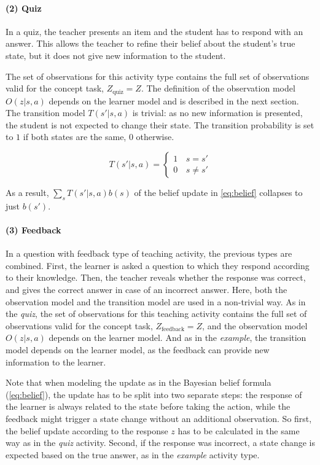 \paragraph{(2) Quiz} In a quiz, the teacher presents an item and the student has to respond with an answer.
This allows the teacher to refine their belief about the student's true state, but it does not give new information to the student. 

The set of observations for this activity type contains the full set of observations valid for the concept task, $Z_{\text{quiz}} = Z$.
The definition of the observation model $O(z|s,a)$ depends on the learner model and is described in the next section. 
The transition model $T(s'|s,a)$ is trivial: as no new information is presented, the student is not expected to change their state. The transition probability is set to $1$ if both states are the same, $0$ otherwise.

\begin{equation}
    T(s'|s,a) = \begin{cases}
        1 & \, s  = s' \\
        0 & \, s \neq s'
    \end{cases}
\end{equation}

As a result, $\sum_s{T(s'|s,a) b(s)}$ of the belief update in \autoref{eq:belief} collapses to just $b(s')$.

\paragraph{(3) Feedback} In a question with feedback type of teaching activity, the previous types are combined. First, the learner is asked a question to which they respond according to their knowledge. Then, the teacher reveals whether the response was correct, and gives the correct answer in case of an incorrect answer. 
Here, both the observation model and the transition model are used in a non-trivial way. 
As in the \textit{quiz}, the set of observations for this teaching activity contains the full set of observations valid for the concept task, $Z_{\text{feedback}} = Z$, and the observation model $O(z|s,a)$ depends on the learner model. 
And as in the \textit{example}, the transition model depends on the learner model, as the feedback can provide new information to the learner.

Note that when modeling the update as in the Bayesian belief formula (\ref{eq:belief}), the update has to be split into two separate steps: the response of the learner is always related to the state before taking the action, while the feedback might trigger a state change without an additional observation. So first, the belief update according to the response $z$ has to be calculated in the same way as in the \textit{quiz} activity. Second, if the response was incorrect, a state change is expected based on the true answer, as in the \textit{example} activity type.

